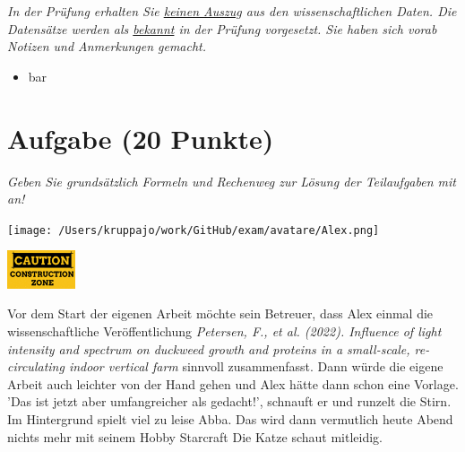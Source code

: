 \documentclass[a4paper, 9pt]{scrartcl}\usepackage[]{graphicx}\usepackage[]{xcolor}
\begin{document}
\textit{In der Prüfung erhalten Sie \underline{keinen Auszug} aus den wissenschaftlichen Daten. Die Datensätze werden als \underline{bekannt} in der Prüfung vorgesetzt. Sie haben sich vorab Notizen und Anmerkungen gemacht.}

\begin{itemize}[noitemsep]
\item bar
\end{itemize}

\clearpage

\section{Aufgabe \hfill (20 Punkte)}

\textit{Geben Sie grundsätzlich Formeln und Rechenweg zur Lösung der Teilaufgaben mit an!} \\[1Ex]
 

 
\begin{minipage}[t]{0.5\textwidth}
\texttt{[image: /Users/kruppajo/work/GitHub/exam/avatare/Alex.png]}
\end{minipage}
\begin{minipage}[t]{0.5\textwidth}
\hfill
\href{https://youtu.be/C9skfFRTHhI}{\includegraphics[width = 2cm]{img/caution}}
\end{minipage}
\vspace{1ex}



Vor dem Start der eigenen Arbeit möchte sein Betreuer, dass Alex einmal die wissenschaftliche Veröffentlichung \textit{Petersen, F., et al. (2022). Influence of light intensity and spectrum on duckweed growth and proteins in a small-scale, re-circulating indoor vertical farm} sinnvoll zusammenfasst. Dann würde die eigene Arbeit auch leichter von der Hand gehen und Alex hätte dann schon eine Vorlage. 'Das ist jetzt aber umfangreicher als gedacht!', schnauft er und runzelt die Stirn. Im Hintergrund spielt viel zu leise Abba. Das wird dann vermutlich heute Abend nichts mehr mit seinem Hobby Starcraft Die Katze schaut mitleidig.\\
\end{document}
